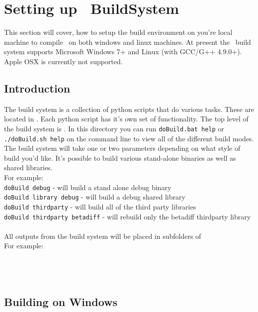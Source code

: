 \section{Setting up \CNAME\ BuildSystem\label{sec:build_environment}}
This section will cover, how to setup the build environment on you're local machine to compile \CNAME\, on both windows and linux machines. At present the \CNAME\ build system supports Microsoft Windows 7+ and Linux (with GCC/G++ 4.9.0+). Apple OSX is currently not supported.
\subsection{Introduction}
The build system is a collection of python scripts that do various tasks. These are located in . Each python script has it’s own set of functionality. The top level of the build system is . In this directory you can run \texttt{doBuild.bat help} or \texttt{./doBuild.sh help} on the command line to view all of the different build modes. The build system will take one or two parameters depending on what style of build you’d like. It’s possible to build various stand-alone binaries as well as shared libraries.
\\
For example:
\\
\texttt{doBuild debug} - will build a stand alone debug binary
\\
\texttt{doBuild library debug} - will build a debug shared library
\\
\texttt{doBuild thirdparty} - will build all of the third party libraries
\\
\texttt{doBuild thirdparty betadiff} - will rebuild only the betadiff thirdparty library
\\\\
All outputs from the build system will be placed in subfolders of 
\\
For example:
\\
\\
\\
\\

\subsection{Building on Windows}
